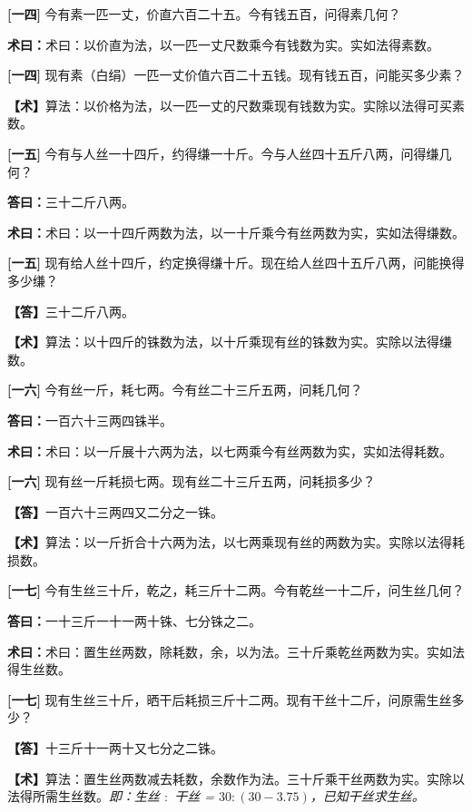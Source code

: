 \documentclass[10pt,a4paper]{article}
\newlength{\lw}
\newlength{\rw}
\newcommand{\bilingc}[2]{%
  \par\vspace{0.1em}%
  \noindent\begin{minipage}[t]{\lw}
  {\small #1}
  \end{minipage}%
  \hfill%
  \begin{minipage}[t]{\rw}
  {\small #2}
  \end{minipage}%
  \vspace{0.1em}%
}
\newcommand{\da}{\textbf{\textcolor{answercolor}{答曰：}}}
\newcommand{\daB}{\textbf{\textcolor{answercolor}{【答】}}}
\newcommand{\shu}{\textbf{\textcolor{methodcolor}{术曰：}}}
\newcommand{\shuB}{\textbf{\textcolor{methodcolor}{【术】}}}
\newcommand{\pn}[1]{\textbf{[#1]}}
\begin{document}
\vspace{0.3em}

\bilingc{
\pn{一四} 今有素一匹一丈，价直六百二十五。今有钱五百，问得素几何？

\shu 术曰：以价直为法，以一匹一丈尺数乘今有钱数为实。实如法得素数。
}{
\pn{一四} 现有素（白绢）一匹一丈价值六百二十五钱。现有钱五百，问能买多少素？

\shuB 算法：以价格为法，以一匹一丈的尺数乘现有钱数为实。实除以法得可买素数。
}

\vspace{0.3em}

\bilingc{
\pn{一五} 今有与人丝一十四斤，约得缣一十斤。今与人丝四十五斤八两，问得缣几何？

\da 三十二斤八两。

\shu 术曰：以一十四斤两数为法，以一十斤乘今有丝两数为实，实如法得缣数。
}{
\pn{一五} 现有给人丝十四斤，约定换得缣十斤。现在给人丝四十五斤八两，问能换得多少缣？

\daB 三十二斤八两。

\shuB 算法：以十四斤的铢数为法，以十斤乘现有丝的铢数为实。实除以法得缣数。
}

\vspace{0.3em}

\bilingc{
\pn{一六} 今有丝一斤，耗七两。今有丝二十三斤五两，问耗几何？

\da 一百六十三两四铢半。

\shu 术曰：以一斤展十六两为法，以七两乘今有丝两数为实，实如法得耗数。
}{
\pn{一六} 现有丝一斤耗损七两。现有丝二十三斤五两，问耗损多少？

\daB 一百六十三两四又二分之一铢。

\shuB 算法：以一斤折合十六两为法，以七两乘现有丝的两数为实。实除以法得耗损数。
}

\vspace{0.3em}

\bilingc{
\pn{一七} 今有生丝三十斤，乾之，耗三斤十二两。今有乾丝一十二斤，问生丝几何？

\da 一十三斤一十一两十铢、七分铢之二。

\shu 术曰：置生丝两数，除耗数，余，以为法。三十斤乘乾丝两数为实。实如法得生丝数。
}{
\pn{一七} 现有生丝三十斤，晒干后耗损三斤十二两。现有干丝十二斤，问原需生丝多少？

\daB 十三斤十一两十又七分之二铢。

\shuB 算法：置生丝两数减去耗数，余数作为法。三十斤乘干丝两数为实。实除以法得所需生丝数。\textit{即：生丝 $:$ 干丝 = $30 : (30-3.75)$，已知干丝求生丝。}
}
\end{document}
